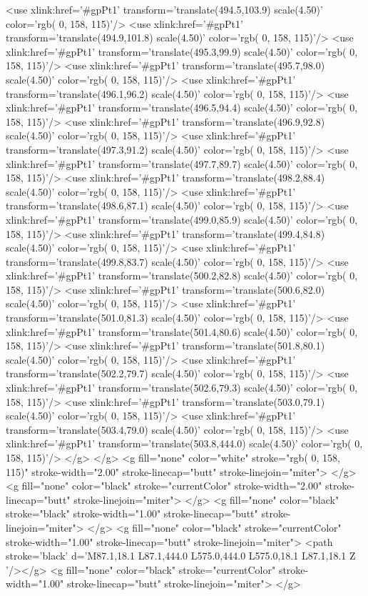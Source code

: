 	<use xlink:href='#gpPt1' transform='translate(494.5,103.9) scale(4.50)' color='rgb(  0, 158, 115)'/>
	<use xlink:href='#gpPt1' transform='translate(494.9,101.8) scale(4.50)' color='rgb(  0, 158, 115)'/>
	<use xlink:href='#gpPt1' transform='translate(495.3,99.9) scale(4.50)' color='rgb(  0, 158, 115)'/>
	<use xlink:href='#gpPt1' transform='translate(495.7,98.0) scale(4.50)' color='rgb(  0, 158, 115)'/>
	<use xlink:href='#gpPt1' transform='translate(496.1,96.2) scale(4.50)' color='rgb(  0, 158, 115)'/>
	<use xlink:href='#gpPt1' transform='translate(496.5,94.4) scale(4.50)' color='rgb(  0, 158, 115)'/>
	<use xlink:href='#gpPt1' transform='translate(496.9,92.8) scale(4.50)' color='rgb(  0, 158, 115)'/>
	<use xlink:href='#gpPt1' transform='translate(497.3,91.2) scale(4.50)' color='rgb(  0, 158, 115)'/>
	<use xlink:href='#gpPt1' transform='translate(497.7,89.7) scale(4.50)' color='rgb(  0, 158, 115)'/>
	<use xlink:href='#gpPt1' transform='translate(498.2,88.4) scale(4.50)' color='rgb(  0, 158, 115)'/>
	<use xlink:href='#gpPt1' transform='translate(498.6,87.1) scale(4.50)' color='rgb(  0, 158, 115)'/>
	<use xlink:href='#gpPt1' transform='translate(499.0,85.9) scale(4.50)' color='rgb(  0, 158, 115)'/>
	<use xlink:href='#gpPt1' transform='translate(499.4,84.8) scale(4.50)' color='rgb(  0, 158, 115)'/>
	<use xlink:href='#gpPt1' transform='translate(499.8,83.7) scale(4.50)' color='rgb(  0, 158, 115)'/>
	<use xlink:href='#gpPt1' transform='translate(500.2,82.8) scale(4.50)' color='rgb(  0, 158, 115)'/>
	<use xlink:href='#gpPt1' transform='translate(500.6,82.0) scale(4.50)' color='rgb(  0, 158, 115)'/>
	<use xlink:href='#gpPt1' transform='translate(501.0,81.3) scale(4.50)' color='rgb(  0, 158, 115)'/>
	<use xlink:href='#gpPt1' transform='translate(501.4,80.6) scale(4.50)' color='rgb(  0, 158, 115)'/>
	<use xlink:href='#gpPt1' transform='translate(501.8,80.1) scale(4.50)' color='rgb(  0, 158, 115)'/>
	<use xlink:href='#gpPt1' transform='translate(502.2,79.7) scale(4.50)' color='rgb(  0, 158, 115)'/>
	<use xlink:href='#gpPt1' transform='translate(502.6,79.3) scale(4.50)' color='rgb(  0, 158, 115)'/>
	<use xlink:href='#gpPt1' transform='translate(503.0,79.1) scale(4.50)' color='rgb(  0, 158, 115)'/>
	<use xlink:href='#gpPt1' transform='translate(503.4,79.0) scale(4.50)' color='rgb(  0, 158, 115)'/>
	<use xlink:href='#gpPt1' transform='translate(503.8,444.0) scale(4.50)' color='rgb(  0, 158, 115)'/>
</g>
	</g>
<g fill="none" color="white" stroke="rgb(  0, 158, 115)" stroke-width="2.00" stroke-linecap="butt" stroke-linejoin="miter">
</g>
<g fill="none" color="black" stroke="currentColor" stroke-width="2.00" stroke-linecap="butt" stroke-linejoin="miter">
</g>
<g fill="none" color="black" stroke="black" stroke-width="1.00" stroke-linecap="butt" stroke-linejoin="miter">
</g>
<g fill="none" color="black" stroke="currentColor" stroke-width="1.00" stroke-linecap="butt" stroke-linejoin="miter">
	<path stroke='black'  d='M87.1,18.1 L87.1,444.0 L575.0,444.0 L575.0,18.1 L87.1,18.1 Z  '/></g>
<g fill="none" color="black" stroke="currentColor" stroke-width="1.00" stroke-linecap="butt" stroke-linejoin="miter">
</g>

